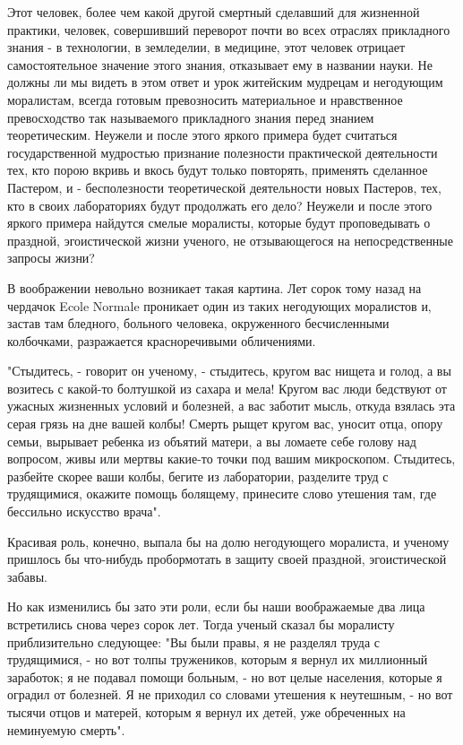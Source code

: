 Этот человек, более  чем какой другой  смертный сделавший для  жизненной
практики,  человек,  совершивший  переворот   почти  во  всех   отраслях
прикладного знания  -  в  технологии, в  земледелии,  в  медицине,  этот
человек отрицает самостоятельное значение этого знания, отказывает ему в
названии науки. Не  должны ли мы  видеть в этом  ответ и урок  житейским
мудрецам  и   негодующим   моралистам,   всегда   готовым   превозносить
материальное и  нравственное превосходство  так называемого  прикладного
знания перед знанием теоретическим. Неужели и после этого яркого примера
будет   считаться   государственной   мудростью   признание   полезности
практической деятельности тех,  кто порою  вкривь и  вкось будут  только
повторять, применять сделанное Пастером, и - бесполезности теоретической
деятельности  новых  Пастеров,  тех,  кто  в  своих  лабораториях  будут
продолжать его  дело?  Неужели и  после  этого яркого  примера  найдутся
смелые моралисты, которые будут проповедывать о праздной,  эгоистической
жизни ученого, не отзывающегося на непосредственные запросы жизни?

В воображении невольно возникает такая картина. Лет сорок тому назад  на
чердачок Ecole Normale проникает один из таких негодующих моралистов  и,
застав  там  бледного,  больного  человека,  окруженного   бесчисленными
колбочками, разражается красноречивыми обличениями.

"Стыдитесь, -  говорит он  ученому,  - стыдитесь,  кругом вас  нищета  и
голод, а вы возитесь с какой-то  болтушкой из сахара и мела! Кругом  вас
люди бедствуют от ужасных  жизненных условий и  болезней, а вас  заботит
мысль, откуда взялась эта серая грязь  на дне вашей колбы! Смерть  рыщет
кругом вас,  уносит  отца,  опору семьи,  вырывает  ребенка  из  объятий
матери, а вы ломаете себе голову над вопросом, живы или мертвы  какие-то
точки под  вашим микроскопом.  Стыдитесь,  разбейте скорее  ваши  колбы,
бегите из  лаборатории, разделите  труд  с трудящимися,  окажите  помощь
болящему, принесите слово утешения там, где бессильно искусство врача".

Красивая роль,  конечно,  выпала бы  на  долю негодующего  моралиста,  и
ученому пришлось  бы что-нибудь  пробормотать в  защиту своей  праздной,
эгоистической забавы.

Но как изменились бы зато эти  роли, если бы наши воображаемые два  лица
встретились снова  через сорок  лет. Тогда  ученый сказал  бы  моралисту
приблизительно  следующее:  "Вы  были  правы,  я  не  разделял  труда  с
трудящимися, - но вот толпы  тружеников, которым я вернул их  миллионный
заработок; я  не  подавал помощи  больным,  - но  вот  целые  населения,
которые я  оградил от  болезней. Я  не приходил  со словами  утешения  к
неутешным, - но вот тысячи отцов  и матерей, которым я вернул их  детей,
уже обреченных на неминуемую смерть".

